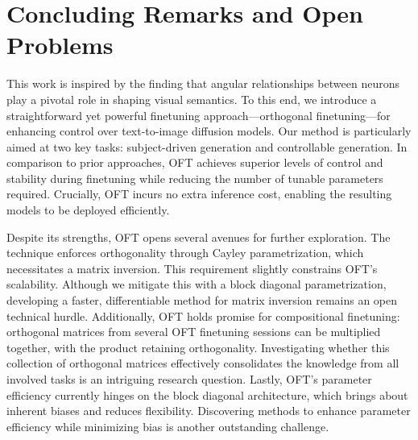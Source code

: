 \section{Concluding Remarks and Open Problems}

This work is inspired by the finding that angular relationships between neurons play a pivotal role in shaping visual semantics. To this end, we introduce a straightforward yet powerful finetuning approach—orthogonal finetuning—for enhancing control over text-to-image diffusion models. Our method is particularly aimed at two key tasks: subject-driven generation and controllable generation. In comparison to prior approaches, OFT achieves superior levels of control and stability during finetuning while reducing the number of tunable parameters required. Crucially, OFT incurs no extra inference cost, enabling the resulting models to be deployed efficiently.

Despite its strengths, OFT opens several avenues for further exploration. The technique enforces orthogonality through Cayley parametrization, which necessitates a matrix inversion. This requirement slightly constrains OFT's scalability. Although we mitigate this with a block diagonal parametrization, developing a faster, differentiable method for matrix inversion remains an open technical hurdle. Additionally, OFT holds promise for compositional finetuning: orthogonal matrices from several OFT finetuning sessions can be multiplied together, with the product retaining orthogonality. Investigating whether this collection of orthogonal matrices effectively consolidates the knowledge from all involved tasks is an intriguing research question. Lastly, OFT's parameter efficiency currently hinges on the block diagonal architecture, which brings about inherent biases and reduces flexibility. Discovering methods to enhance parameter efficiency while minimizing bias is another outstanding challenge.

